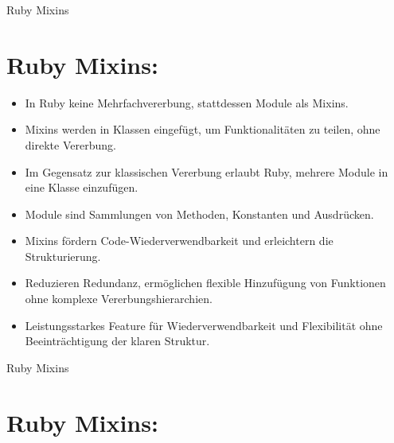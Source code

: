 \documentclass{beamer}
\begin{document}
\begin{frame}{Ruby Mixins}
\section*{Ruby Mixins:}

\begin{itemize}
  \item In Ruby keine Mehrfachvererbung, stattdessen Module als Mixins.
  \item Mixins werden in Klassen eingefügt, um Funktionalitäten zu teilen, ohne direkte Vererbung.
  \item Im Gegensatz zur klassischen Vererbung erlaubt Ruby, mehrere Module in eine Klasse einzufügen.
  \item Module sind Sammlungen von Methoden, Konstanten und Ausdrücken.
  \item Mixins fördern Code-Wiederverwendbarkeit und erleichtern die Strukturierung.
  \item Reduzieren Redundanz, ermöglichen flexible Hinzufügung von Funktionen ohne komplexe Vererbungshierarchien.
  \item Leistungsstarkes Feature für Wiederverwendbarkeit und Flexibilität ohne Beeinträchtigung der klaren Struktur.
\end{itemize}
\end{frame}
\begin{frame}{Ruby Mixins}
\section*{Ruby Mixins:}


\end{frame}
\end{document}
